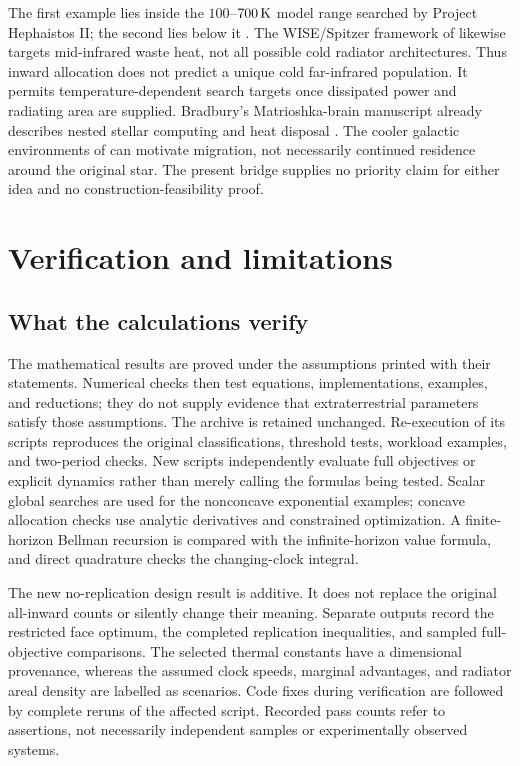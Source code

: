 The first example lies inside the $100$--$700\,{\rm K}$ model range
searched by Project Hephaistos II; the second lies below it
\citep{Suazo2024}. The WISE/Spitzer framework of \citet{Wright2014b}
likewise targets mid-infrared waste heat, not all possible cold radiator
architectures. Thus inward allocation does not predict a unique cold
far-infrared population. It permits temperature-dependent search targets
once dissipated power and radiating area are supplied. Bradbury's
Matrioshka-brain manuscript already describes nested stellar computing
and heat disposal \citep{Bradbury1999}. The cooler galactic environments
of \citet{CirkovicBradbury2006} can motivate migration, not necessarily
continued residence around the original star. The present bridge supplies
no priority claim for either idea and no construction-feasibility proof.

\section{Verification and limitations}
\label{sec:verification}
\subsection{What the calculations verify}
The mathematical results are proved under the assumptions printed with
their statements. Numerical checks then test equations, implementations,
examples, and reductions; they do not supply evidence that extraterrestrial
parameters satisfy those assumptions. The archive is retained unchanged.
Re-execution of its scripts reproduces the original classifications,
threshold tests, workload examples, and two-period checks. New scripts
independently evaluate full objectives or explicit dynamics rather than
merely calling the formulas being tested. Scalar global searches are used
for the nonconcave exponential examples; concave allocation checks use
analytic derivatives and constrained optimization. A finite-horizon
Bellman recursion is compared with the infinite-horizon value formula,
and direct quadrature checks the changing-clock integral.

The new no-replication design result is additive. It does not replace the
original all-inward counts or silently change their meaning. Separate
outputs record the restricted face optimum, the completed replication
inequalities, and sampled full-objective comparisons. The selected
thermal constants have a dimensional provenance, whereas the assumed
clock speeds, marginal advantages, and radiator areal density are labelled
as scenarios. Code fixes during verification are followed by complete
reruns of the affected script. Recorded pass counts refer to assertions,
not necessarily independent samples or experimentally observed systems.

